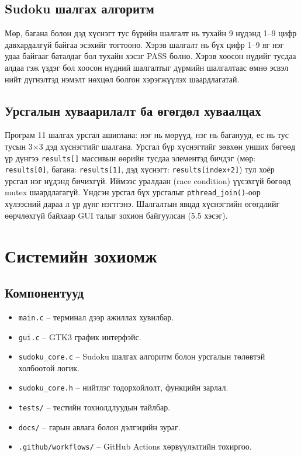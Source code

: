 \documentclass[12pt,a4paper]{report}
\begin{document}
	\section{Sudoku шалгах алгоритм}
	Мөр, багана болон дэд хүснэгт тус бүрийн шалгалт нь тухайн 9 нүдэнд 1--9 цифр давхардалгүй байгаа эсэхийг тогтооно. Хэрэв шалгалт нь бүх цифр 1--9 яг нэг удаа байгааг баталдаг бол тухайн хэсэг PASS болно. Хэрэв хоосон нүдийг тусдаа алдаа гэж үздэг бол хоосон нүдний шалгалтыг дүрмийн шалгалтаас өмнө эсвэл нийт дүгнэлтэд нэмэлт нөхцөл болгон хэрэгжүүлэх шаардлагатай.
	
	\section{Урсгалын хуваарилалт ба өгөгдөл хуваалцах}
	Програм 11 шалгах урсгал ашиглана: нэг нь мөрүүд, нэг нь баганууд, ес нь тус тусын 3$\times$3 дэд хүснэгтийг шалгана. Урсгал бүр хүснэгтийг зөвхөн унших бөгөөд үр дүнгээ \texttt{results[]} массивын өөрийн тусдаа элементэд бичдэг (мөр: \texttt{results[0]}, багана: \texttt{results[1]}, дэд хүснэгт: \texttt{results[index+2]}) тул хоёр урсгал нэг нүдэнд бичихгүй. Иймээс уралдаан (race condition) үүсэхгүй бөгөөд mutex шаардлагагүй. Үндсэн урсгал бүх урсгалыг \texttt{pthread\_join()}-оор хүлээсний дараа л үр дүнг нэгтгэнэ. Шалгалтын явцад хүснэгтийн өгөгдлийг өөрчлөхгүй байхаар GUI талыг зохион байгуулсан (5.5 хэсэг).
	
	\chapter{Системийн зохиомж}
	
	\section{Компонентууд}
	\begin{itemize}
		\item \texttt{main.c} -- терминал дээр ажиллах хувилбар.
		\item \texttt{gui.c} -- GTK3 график интерфэйс.
		\item \texttt{sudoku\_core.c} -- Sudoku шалгах алгоритм болон урсгалын төлөвтэй холбоотой логик.
		\item \texttt{sudoku\_core.h} -- нийтлэг тодорхойлолт, функцийн зарлал.
		\item \texttt{tests/} -- тестийн тохиолдлуудын тайлбар.
		\item \texttt{docs/} -- гарын авлага болон дэлгэцийн зураг.
		\item \texttt{.github/workflows/} -- GitHub Actions хөрвүүлэлтийн тохиргоо.
	\end{itemize}
	
\end{document}
